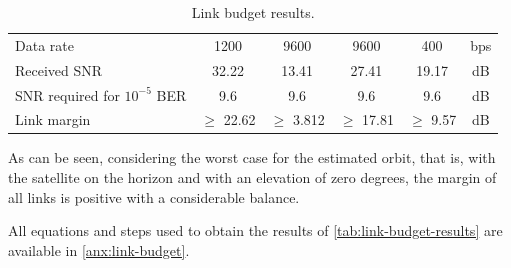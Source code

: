 \begin{table}[!h]
\begin{tabular}{L{0.3\textwidth}ccccc}
        Data rate                       & 1200          & 9600          & 9600          & 400           & bps \\
        Received SNR                    & 32.22         & 13.41         & 27.41         & 19.17         & dB \\
        SNR required for $10^{-5}$ BER\footnotemark & 9.6           & 9.6           & 9.6           & 9.6           & dB \\
        Link margin                     & $\geq$ 22.62  & $\geq$ 3.812  & $\geq$ 17.81  & $\geq$ 9.57   & dB \\
        \bottomrule[1.5pt]
    \end{tabular}
    \caption{Link budget results.}
    \label{tab:link-budget-results}
\end{table}


As can be seen, considering the worst case for the estimated orbit, that is, with the satellite on the horizon and with an elevation of zero degrees, the margin of all links is positive with a considerable balance.

All equations and steps used to obtain the results of \autoref{tab:link-budget-results} are available in \autoref{anx:link-budget}.
